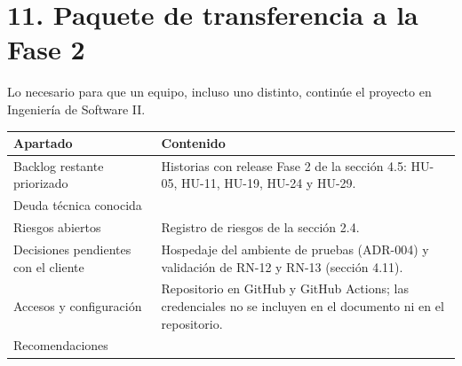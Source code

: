 \section{11. Paquete de transferencia a la Fase
2}\label{paquete-de-transferencia-a-la-fase-2}

Lo necesario para que un equipo, incluso uno distinto, continúe el
proyecto en Ingeniería de Software II.

{\def\LTcaptype{none} %
\begin{longtable}[]{@{}
  >{\raggedright\arraybackslash}p{}
  >{\raggedright\arraybackslash}p{}@{}}
\toprule\noalign{}
\begin{minipage}[b]{\linewidth}\raggedright
\textbf{Apartado}
\end{minipage} & \begin{minipage}[b]{\linewidth}\raggedright
\textbf{Contenido}
\end{minipage} \\
\midrule\noalign{}
\endhead
\bottomrule\noalign{}
\endlastfoot
Backlog restante priorizado & Historias con release Fase 2 de la
sección 4.5: HU-05, HU-11, HU-19, HU-24 y HU-29. \\
Deuda técnica conocida & \pendiente{} \\
Riesgos abiertos & Registro de riesgos de la sección 2.4. \\
Decisiones pendientes con el cliente & Hospedaje del ambiente de
pruebas (ADR-004) y validación de RN-12 y RN-13 (sección 4.11). \\
Accesos y configuración & Repositorio en GitHub y GitHub Actions; las
credenciales no se incluyen en el documento ni en el repositorio. \\
Recomendaciones & \pendiente{} \\
\end{longtable}
}
